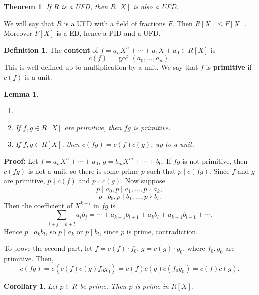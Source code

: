 \documentclass[12pt]{article}
\newtheorem{theorem}{Theorem}[section]
\newtheorem{corollary}{Corollary}[section]
\newtheorem{lemma}{Lemma}[section]
\theoremstyle{definition}
\newtheorem{definition}{Definition}[section]
\theoremstyle{remark}
\begin{document}
\begin{theorem}
	If $R$ is a UFD, then $R[X]$ is also a UFD.
\end{theorem}

We will say that $R$ is a UFD with a field of fractions $F$. Then $R[X] \leq F[X]$. Moreover $F[X]$ is a ED, hence a PID and a UFD.

\begin{definition}
	The \textbf{content} of $f = a_n X^{n} + \cdots + a_1 X + a_0 \in R[X]$ is
	\[
		c(f) = \gcd (a_0, \ldots, a_n)
	.\]
	This is well defined up to multiplication by a unit. We say that $f$ is \textbf{primitive} if $c(f)$ is a unit.
\end{definition}

\begin{lemma}
	\begin{enumerate}[\normalfont(i)]
		\item[]
		\item If $f, g \in R[X]$ are primitive, then $fg$ is primitive.
		\item If $f, g \in R[X]$, then $c(fg) = c(f)c(g)$, up to a unit.
	\end{enumerate}
\end{lemma}

\begin{adjustbox}{minipage = \columnwidth - 25.5pt, margin=1em, frame=1pt, margin=0em}
	\textbf{Proof:} Let $f = a_nX^{n} + \cdots + a_0$, $g = b_mX^{m} + \cdots + b_0$. If $fg$ is not primitive, then $c(fg)$ is not a unit, so there is some prime $p$ such that $p \mid c(fg)$. Since $f$ and $g$ are primitive, $p \nmid c(f)$ and $p \nmid c(g)$. Now suppose
	\[
	p \mid a_0, p \mid a_1, \ldots , p \nmid a_k,
	\]
	\[
	p \mid b_0, p \mid b_1, \ldots, p \nmid b_l
	.\]
	Then the coefficient of $X^{k + l}$ in $fg$ is
	\[
	\sum_{i + j = k + l}a_i b_j = \cdots + a_{k - 1}b_{l + 1} + a_kb_l + a_{k + 1}b_{l - 1} + \cdots
	.\]
	Hence $p \mid a_kb_l$, so $p \mid a_k$ or $p \mid b_l$, since $p$ is prime, contradiction.

	To prove the second part, let $f = c(f) \cdot f_0$, $g = c(g) \cdot g_0$, where $f_0, g_0$ are primitive. Then,
	\[
		c(fg) = c(c(f)c(g) f_0 g_0) = c(f)c(g) c(f_0g_0) = c(f)c(g)
	.\]
\end{adjustbox}

\begin{corollary}
	Let $p \in R$ be prime. Then $p$ is prime in $R[X]$.
\end{corollary}
\end{document}
